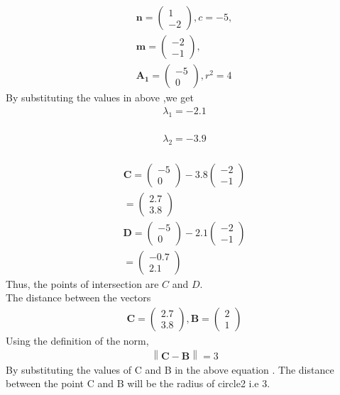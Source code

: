 \documentclass[journal,10pt,twocolumn]{article}
\newcommand{\myvec}[1]{\ensuremath{\begin{pmatrix}#1\end{pmatrix}}}
\providecommand{\norm}[1]{\left\lVert#1\right\rVert}
\numberwithin{equation}{subsection}
\let\vec\mathbf
\begin{document}
		   \begin{align}
		        \vec{n} = \myvec{1 \\ -2}, c = -5,
		        \\
	        	\vec{m} = \myvec{-2\\ -1}, 
			    \\
			    \vec{A_1} = \myvec{-5 \\ 0},  r^2 = 4
		   \end{align}
\textbf{} By substituting the values in above ,we get		   
		     \begin{align}
			    \lambda_1 =- 2.1
		    \end{align}
		    \\
		     \begin{align}
			    \lambda_2 = -3.9
		    \end{align}
		    \\
		    \begin{align}
			    \vec{C} = \myvec{-5 \\ 0} - 3.8 \myvec{ -2\\ -1}
			    \\
			    = \myvec{2.7 \\3.8 }
		    \end{align}
		    \begin{align}
			    \vec{D} = \myvec{-5 \\ 0} -  2.1 \myvec{-2 \\ -1}
			    \\
			    = \myvec{-0.7 \\ 2.1}
		    \end{align}
		    Thus, the points of intersection are $C$ and $D$.
		    \\
		\textbf{} The distance between the vectors 
		\begin{align}
		  \vec{C}=\myvec{2.7 \\3.8 } ,    \vec{B}=\myvec{2\\1}  
		\end{align}
    \textbf{}Using the definition   of the norm, 
		\begin{align}
\norm{\vec{C}-\vec{B}} = 3
\end{align}
 	\textbf{}  	By substituting the values of C and B in the above equation . The distance between the point C and B will be the radius of circle2 i.e 3.
 
\end{document}
